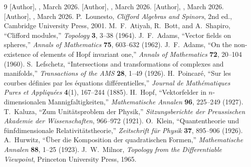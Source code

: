 \documentclass[12pt,a4paper]{article}
\begin{document}
\begin{thebibliography}{9}
 [Author], , March 2026.
 [Author], , March 2026.
 [Author], , March 2026.
 [Author], ,
March 2026.
 P.~Lounesto, \emph{Clifford Algebras and Spinors}, 2nd ed., Cambridge
University Press, 2001.
 M.~F.~Atiyah, R.~Bott, and A.~Shapiro, ``Clifford modules,''
\emph{Topology} \textbf{3}, 3--38 (1964).
 J.~F.~Adams, ``Vector fields on spheres,'' \emph{Annals of Mathematics}
\textbf{75}, 603--632 (1962).
 J.~F.~Adams, ``On the non-existence of elements of Hopf invariant one,''
\emph{Annals of Mathematics} \textbf{72}, 20--104 (1960).
 S.~Lefschetz, ``Intersections and transformations of complexes and
manifolds,'' \emph{Transactions of the AMS} \textbf{28}, 1--49 (1926).
 H.~Poincar\'{e}, ``Sur les courbes d\'{e}finies par les \'{e}quations
diff\'{e}rentielles,'' \emph{Journal de Math\'{e}matiques Pures et Appliqu\'{e}es}
\textbf{4}(1), 167--244 (1885).
 H.~Hopf, ``Vektorfelder in $n$-dimensionalen Mannigfaltigkeiten,''
\emph{Mathematische Annalen} \textbf{96}, 225--249 (1927).
 T.~Kaluza, ``Zum Unit\"{a}tsproblem der Physik,'' \emph{Sitzungsberichte
der Preussischen Akademie der Wissenschaften}, 966--972 (1921).
 O.~Klein, ``Quantentheorie und f\"{u}nfdimensionale Relativit\"{a}tstheorie,''
\emph{Zeitschrift f\"{u}r Physik} \textbf{37}, 895--906 (1926).
 A.~Hurwitz, ``\"{U}ber die Komposition der quadratischen Formen,''
\emph{Mathematische Annalen} \textbf{88}, 1--25 (1923).
 J.~W.~Milnor, \emph{Topology from the Differentiable Viewpoint},
Princeton University Press, 1965.
\end{thebibliography}
\end{document}
